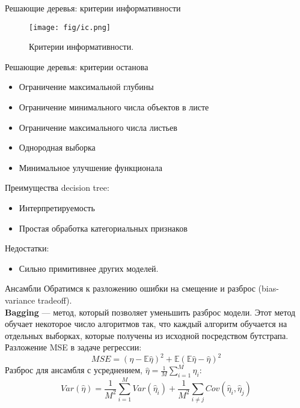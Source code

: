 \documentclass[handout]{beamer}
\begin{document}
\begin{frame}{Решающие деревья: критерии информативности}
	\begin{figure}
	    \texttt{[image: fig/ic.png]}
	    \caption{\small Критерии информативности.
	    } 
	    \label{fig:w_series}
	\end{figure}
\end{frame}

\begin{frame}{Решающие деревья: критерии останова}
	\begin{itemize}
		\item Ограничение максимальной глубины
		\item Ограничение минимального числа объектов в листе
		\item Ограничение максимального числа листьев
		\item Однородная выборка
		\item Минимальное улучшение функционала
	\end{itemize}
Преимущества decision tree:
	\begin{itemize}
		\item Интерпретируемость
		\item Простая обработка категориальных признаков
	\end{itemize}
	Недостатки:
	\begin{itemize}
		\item Сильно примитивнее других моделей.
	\end{itemize}
\end{frame}

\begin{frame}{Ансамбли}
	Обратимся к разложению ошибки на смещение и разброс (bias-variance tradeoff).\\
	\textbf{Bagging} --- метод, который позволяет уменьшить разброс модели. Этот метод обучает некоторое число алгоритмов так, что каждый алгоритм обучается на отдельных выборках, которые получены из исходной посредством бутстрапа.\\
	Разложение MSE в задаче регрессии:
	\begin{equation*}
		MSE=(\eta-\mathbb{E}\hat{\eta})^2 + \mathbb{E}(\mathbb{E}\hat{\eta} - \hat{\eta})^2
	\end{equation*}
	Разброс для ансамбля с усреднением, $\hat{\eta}=\frac{1}{M}\sum_{i=1}^M\hat{\eta}_i$:
	\begin{equation*}
		Var(\hat{\eta})=\frac{1}{M^2}\sum_{i=1}^MVar(\hat{\eta}_i)+\frac{1}{M^2}\sum_{i \neq j} Cov(\hat{\eta}_i, \hat{\eta}_j)
	\end{equation*}
\end{frame}
\end{document}
